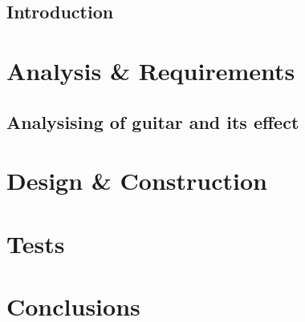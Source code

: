 \chapter{Introduction}

\part{Analysis \& Requirements}\label{pt:analysis} \glsresetall
 \graphicspath{{figures/analysing/}}
 \chapter{Analysising of guitar and its effect}\label{ch:analysing}
 \label{sec:electric_guitar_theory} 
 \label{sec:effects}
\label{sec:platform_comparing}

 \label{sec:FPGA}

\part{Design \& Construction}\label{pt:design} 
 
%
\part{Tests}\label{pt:tests} 
\part{Conclusions}\label{pt:conclusions} 
%

